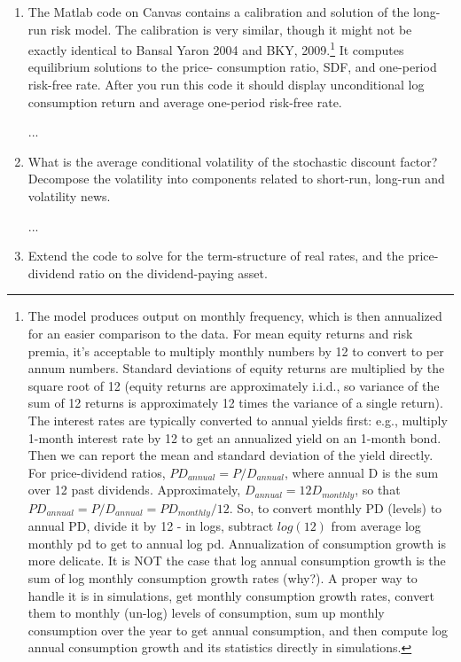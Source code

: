 \documentclass{article}
\begin{document}
\begin{enumerate}

\item The Matlab code on Canvas contains a calibration and solution of the long-run risk model. The calibration is very similar, though it might not be exactly identical to Bansal Yaron 2004 and BKY, 2009.\footnote{The model produces output on monthly frequency, which is then annualized for an easier comparison to the data. For mean equity returns and risk premia, it’s acceptable to multiply monthly numbers by 12 to convert to per annum numbers. Standard deviations of equity returns are multiplied by the square root of 12 (equity returns are approximately i.i.d., so variance of the sum of 12 returns is approximately 12 times the variance of a single return). The interest rates are typically converted to annual yields first: e.g., multiply 1-month interest rate by 12 to get an annualized yield on an 1-month bond. Then we can report the mean and standard deviation of the yield directly. For price-dividend ratios, $PD_{annual} = P/D_{annual}$, where annual D is the sum over 12 past dividends. Approximately, $D_{annual} = 12D_{monthly}$, so that $PD_{annual} = P/D_{annual} = PD_{monthly}/12$. So, to convert monthly PD (levels) to annual PD, divide it by 12 - in logs, subtract $log(12)$ from average log monthly pd to get to annual log pd. Annualization of consumption growth is more delicate. It is NOT the case that log annual consumption growth is the sum of log monthly consumption growth rates (why?). A proper way to handle it is in simulations, get monthly consumption growth rates, convert them to monthly (un-log) levels of consumption, sum up monthly consumption over the year to get annual consumption, and then compute log annual consumption growth and its statistics directly in simulations.} It computes equilibrium solutions to the price- consumption ratio, SDF, and one-period risk-free rate. After you run this code it should display unconditional log consumption return and average one-period risk-free rate.

...

\item  What is the average conditional volatility of the stochastic discount factor? Decompose the volatility into components related to short-run, long-run and volatility news.

...

\item  Extend the code to solve for the term-structure of real rates, and the price-dividend ratio on the dividend-paying asset.


\end{enumerate}
\end{document}
